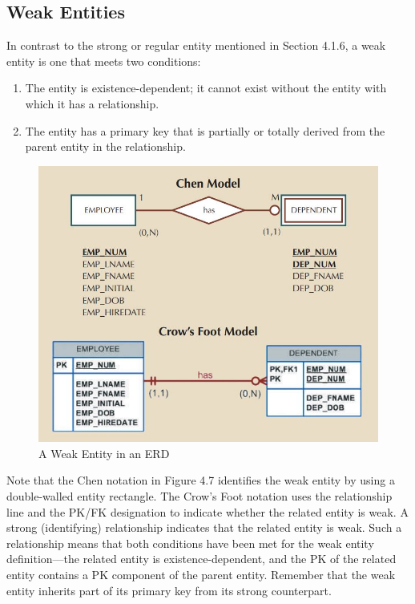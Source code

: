 \documentclass[a4paper, 12pt, titlepage]{report}
\begin{document}
{\subsection{Weak Entities}
In contrast to the strong or regular entity mentioned in Section 4.1.6, a weak entity is one that meets two conditions:
\begin{enumerate}
\item The entity is existence-dependent; it cannot exist without the entity with which it has a relationship.
\item The entity has a primary key that is partially or totally derived from the parent entity in the relationship.
\end{enumerate}
\begin{figure}[H]
\centering
\includegraphics[scale=0.6]{Weak}
\caption{A Weak Entity in an ERD}
\end{figure}
\noindent Note that the Chen notation in Figure 4.7 identifies the weak entity by using a double-walled entity rectangle. The Crow’s Foot notation uses the relationship line and the PK/FK designation to indicate whether the related entity is weak. A strong (identifying) relationship indicates that the related entity is weak. Such a relationship means that both conditions have been met for the weak entity definition—the related entity is existence-dependent, and the PK of the related entity contains a PK component of the parent entity. Remember that the weak entity inherits part of its primary key from its strong counterpart.
}
\end{document}
